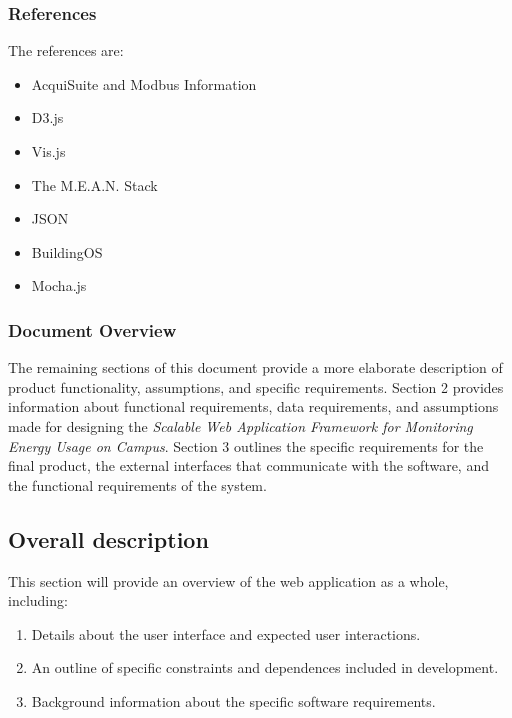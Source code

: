    \subsubsection{References} 
    The references are:
    \begin{itemize}
        \item AcquiSuite and Modbus Information \cite{aquisuite_emb} \cite{modbus_practices} \cite{modbus} \cite{AcquiSuite}
        \item D3.js \cite{d3_home}
        \item Vis.js \cite{vis}
        \item The M.E.A.N. Stack \cite{mean}
        \item JSON \cite{json}
        \item BuildingOS \cite{BuildingOS}
        \item Mocha.js \cite{mochajs}
    \end{itemize}
    
    \normalsize
    \subsubsection{Document Overview}
	The remaining sections of this document provide a more elaborate description of product functionality, assumptions, and specific requirements. Section 2 provides information about functional requirements, data requirements, and assumptions made for designing the \textit{Scalable Web Application Framework for Monitoring Energy Usage on Campus}. Section 3 outlines the specific requirements for the final product, the external interfaces that communicate with the software, and the functional requirements of the system.
	
    \subsection{Overall description}
    This section will provide an overview of the web application as a whole, including:
        \begin{enumerate} 
            \setlength\itemsep{1mm}
            \item Details about the user interface and expected user interactions.
            \item An outline of specific constraints and dependences included in development. 
            \item Background information about the specific software requirements.
        \end{enumerate}
